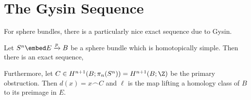 \documentclass[12pt]{extarticle}
\begin{document}


\section{The Gysin Sequence}

For sphere bundles, there is a particularly nice exact sequence due to Gysin.

\begin{theorem}[Gysin]
Let $S^{n} \embed E \xrightarrow{p} B$ be a sphere bundle which is homotopically simple. Then there is an exact sequence,
\begin{center}
\end{center}
Furthermore, let $C \in H^{n+1}(B; \pi_n(S^n)) = H^{n+1}(B; \Z)$ be the primary obstruction. Then $d(x) = x \frown C$ and $\ell$ is the map lifting a homology class of $B$ to its preimage in $E$.
\end{theorem}
\end{document}
